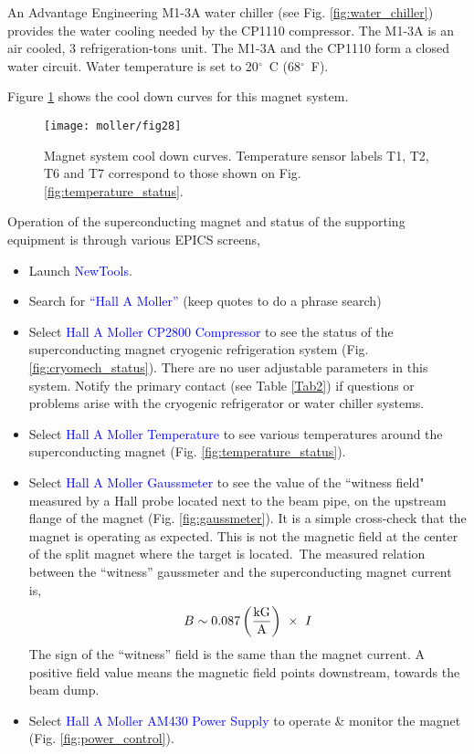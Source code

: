 {An Advantage Engineering M1-3A water chiller (see Fig. \ref{fig:water_chiller}) provides the water cooling needed by the CP1110 compressor.
The M1-3A is an air cooled, 3 refrigeration-tons unit. The M1-3A and the CP1110 form a closed water circuit. Water temperature is set to 20$^\circ$~C (68$^\circ$~F).

Figure \ref{fig:cooldown_curves} shows the cool down curves for this magnet system.

   \begin{figure}%
      \begin{center}
          \texttt{[image: moller/fig28]}
      \end{center}
      \caption[Cool system down curves]{Magnet system cool down curves. Temperature sensor labels T1, T2, T6 and T7 correspond to those shown on Fig. \ref{fig:temperature_status}.}
      \label{fig:cooldown_curves} 
   \end{figure}  

Operation of the superconducting magnet and status of the supporting equipment is through various EPICS screens,
\vspace{-\parskip}
\begin{itemize}
\item Launch \textcolor{blue}{NewTools}.
\item Search for \textcolor{blue}{``Hall A Moller''} (keep quotes to do a phrase search)
\item Select \textcolor{blue}{Hall A Moller CP2800 Compressor} to see the status of the superconducting magnet cryogenic refrigeration system (Fig. \ref{fig:cryomech_status}). There are no user adjustable parameters in this system. Notify the primary contact (see Table \ref{Tab2}) if questions or problems arise with the cryogenic refrigerator or water chiller systems.
\item Select \textcolor{blue}{Hall A Moller Temperature} to see various temperatures around the superconducting magnet (Fig. \ref{fig:temperature_status}).
\item Select \textcolor{blue}{Hall A Moller Gaussmeter} to see the value of the ``witness field" measured by a Hall probe located next to the beam pipe, on the upstream flange of the magnet (Fig. \ref{fig:gaussmeter}). It is a simple cross-check that the magnet is operating as expected. \color{blue}This is not the magnetic field at the center of the split magnet where the target is located.\color{black}\ The measured relation between the ``witness'' gaussmeter and the superconducting magnet current is, 
\begin{displaymath}
B \sim 0.087\left({\rm kG \over A}\right)\ \times\ I
\end{displaymath}
The sign of the ``witness'' field is the same than the magnet current. A positive field value means the magnetic field points downstream, towards the beam dump.
\item Select \textcolor{blue}{Hall A Moller AM430 Power Supply} to operate \& monitor the magnet (Fig. \ref{fig:power_control}).
\end{itemize}

}
